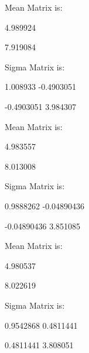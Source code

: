 \documentclass[11pt]{article}
\begin{document}
Mean Matrix is: \

4.989924 \

7.919084 \


Sigma Matrix is: \

1.008933 -0.4903051 \

-0.4903051 3.984307 \


Mean Matrix is: \

4.983557 \

8.013008 \


Sigma Matrix is: \

0.9888262 -0.04890436 \

-0.04890436 3.851085 \


Mean Matrix is: \

4.980537 \

8.022619 \


Sigma Matrix is: \

0.9542868 0.4811441 \

0.4811441 3.808051\
\end{document}

